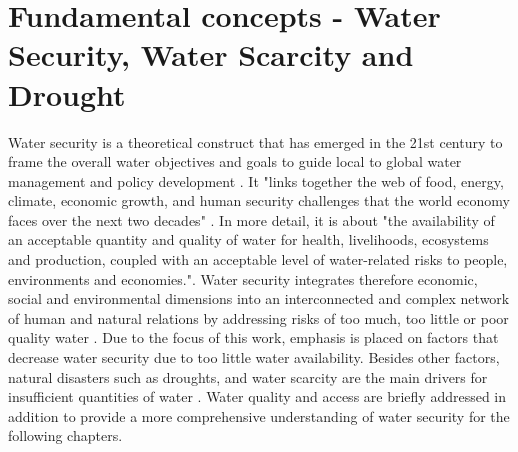 

\section{Fundamental concepts - Water Security, Water Scarcity and Drought}

Water security is a theoretical construct that has emerged in the 21st century to frame the overall water objectives and goals to guide local to global water management and policy development \autocite{sadoffWaterSecurity2020a}. It "links together the web of food, energy, climate, economic growth, and human security challenges that the world economy faces over the next two decades" \autocite[5]{wefBubbleCloseBursting2009}. In more detail, it is about "the availability of an acceptable quantity and quality of water for health, livelihoods, ecosystems and production, coupled with an acceptable level of water-related risks to people, environments and economies."\autocite{greySinkSwimWater2007}.
Water security integrates therefore economic, social and environmental dimensions into an interconnected and complex network of human and natural relations by addressing risks of too much, too little or poor quality water \autocite{vanbeekWaterSecurityPutting2014, mishraWaterSecurityChanging2021}. Due to the focus of this work, emphasis is placed on factors that decrease water security due to too little water availability. Besides other factors, natural disasters such as droughts, and water scarcity are the main drivers for insufficient quantities of water \autocite{caretta2022water}. Water quality and access are briefly addressed in addition to provide a more comprehensive understanding of water security for the following chapters.


